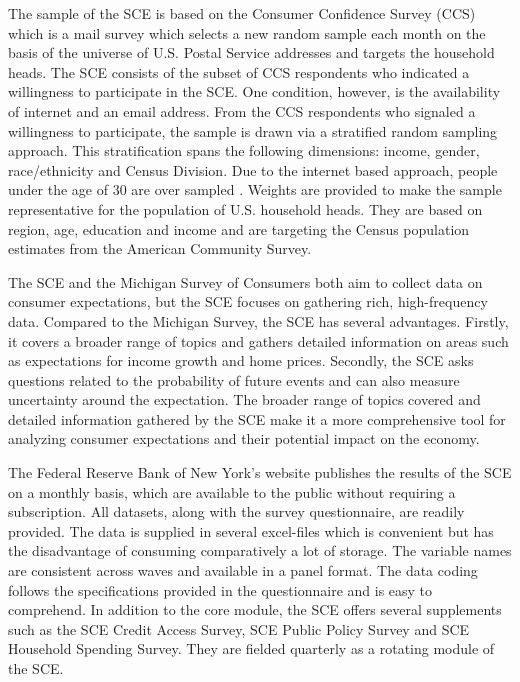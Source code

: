 \documentclass[11pt,a4paper,leqno]{article}
\begin{document}
The sample of the SCE is based on the Consumer Confidence Survey (CCS) which is a mail survey which selects a new random sample each month on the basis of the universe of U.S. Postal Service addresses and targets the household heads. The SCE consists of the subset of CCS respondents who indicated a willingness to participate in the SCE. One condition, however, is the availability of internet and an email address. From the CCS respondents who signaled a willingness to participate, the sample is drawn via a stratified random sampling approach. This stratification spans the following dimensions: income, gender, race/ethnicity and Census Division. Due to the internet based approach, people under the age of 30 are over sampled \parencite{SCEOverview}. Weights are provided to make the sample representative for the population of U.S. household heads. They are based on region, age, education and income and are targeting the Census population estimates from the American Community Survey. 

The SCE and the Michigan Survey of Consumers both aim to collect data on consumer expectations, but the SCE focuses on gathering rich, high-frequency data. Compared to the Michigan Survey, the SCE has several advantages. Firstly, it covers a broader range of topics and gathers detailed information on areas such as expectations for income growth and home prices. Secondly, the SCE asks questions related to the probability of future events and can also measure uncertainty around the expectation. The broader range of topics covered and detailed information gathered by the SCE make it a more comprehensive tool for analyzing consumer expectations and their potential impact on the economy.

The Federal Reserve Bank of New York's website publishes the results of the SCE on a monthly basis, which are available to the public without requiring a subscription.  All datasets, along with the survey questionnaire, are readily provided. The data is supplied in several excel-files which is convenient but has the disadvantage of consuming comparatively a lot of storage. The variable names are consistent across waves and available in a panel format. The data coding follows the specifications provided in the questionnaire and is easy to comprehend. In addition to the core module, the SCE offers several supplements such as the SCE Credit Access Survey, SCE Public Policy Survey and SCE Household Spending Survey. They are fielded quarterly as a rotating module of the SCE. 
\end{document}
